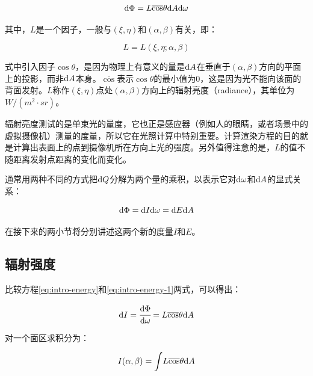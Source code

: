 \begin{equation}\label{eq:intro-energy}
	{\rm d}\Phi=L\overline{\cos}\theta {\rm d}A {\rm d}\omega
\end{equation}

\noindent 其中，$L$是一个因子，一般与$(\xi,\eta)$和$(\alpha,\beta)$有关，即：

\begin{equation}
	L=L(\xi,\eta;\alpha,\beta)
\end{equation}

\noindent 式中引入因子$\cos\theta$，是因为物理上有意义的量是${\rm d}A$在垂直于$(\alpha,\beta)$方向的平面上的投影，而非${\rm d}A$本身。$\overline{\cos}$表示$\cos\theta$的最小值为$0$，这是因为光不能向该面的背面发射。$L$称作$(\xi,\eta)$点处$(\alpha,\beta)$方向上的辐射亮度（radiance），其单位为$W/(m^2\cdot sr)$。

辐射亮度测试的是单束光的量度，它也正是感应器（例如人的眼睛，或者场景中的虚拟摄像机）测量的度量，所以它在光照计算中特别重要。计算渲染方程的目的就是计算出表面上的点到摄像机所在方向上光的强度。另外值得注意的是，$L$的值不随距离发射点距离的变化而变化。

通常用两种不同的方式把${\rm d}Q$分解为两个量的乘积，以表示它对${\rm d}\omega$和${\rm d} A$的显式关系：

\begin{equation}\label{eq:intro-energy-1}
	{\rm d}\Phi={\rm d}I {\rm d}\omega={\rm d}E {\rm d}A
\end{equation}

\noindent 在接下来的两小节将分别讲述这两个新的度量$I$和$E$。





\subsection{辐射强度}
比较方程\ref{eq:intro-energy}和\ref{eq:intro-energy-1}两式，可以得出：

\begin{equation}
	{\rm d}I= \cfrac{{\rm d}\Phi}{{\rm d}\omega}=L\overline{\cos}\theta {\rm d}A
\end{equation}

\noindent 对一个面区求积分为：

\begin{equation}\label{eq:intro-radiant-intensity}
	I(\alpha,\beta)={\rm \int} L\overline{\cos}\theta {\rm d}A
\end{equation}

